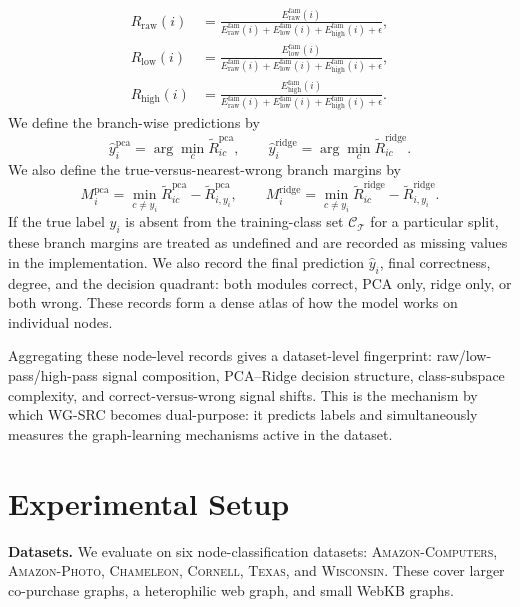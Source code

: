 \documentclass{article}
\newcommand{\Train}{\mathcal{T}}
\newcommand{\Rraw}{R_{\mathrm{raw}}}
\newcommand{\Rlow}{R_{\mathrm{low}}}
\newcommand{\Rhigh}{R_{\mathrm{high}}}
\newcommand{\SRC}{\textsc{WG-SRC}}
\newcommand{\dataset}[1]{\textsc{#1}}
\begin{document}
\begin{align}
\Rraw(i)
&=
\frac{E_{\mathrm{raw}}^{\mathrm{fam}}(i)}
{E_{\mathrm{raw}}^{\mathrm{fam}}(i)
+
E_{\mathrm{low}}^{\mathrm{fam}}(i)
+
E_{\mathrm{high}}^{\mathrm{fam}}(i)
+
\epsilon},\\
\Rlow(i)
&=
\frac{E_{\mathrm{low}}^{\mathrm{fam}}(i)}
{E_{\mathrm{raw}}^{\mathrm{fam}}(i)
+
E_{\mathrm{low}}^{\mathrm{fam}}(i)
+
E_{\mathrm{high}}^{\mathrm{fam}}(i)
+
\epsilon},\\
\Rhigh(i)
&=
\frac{E_{\mathrm{high}}^{\mathrm{fam}}(i)}
{E_{\mathrm{raw}}^{\mathrm{fam}}(i)
+
E_{\mathrm{low}}^{\mathrm{fam}}(i)
+
E_{\mathrm{high}}^{\mathrm{fam}}(i)
+
\epsilon}.
\label{eq:signal-families}
\end{align}
We define the branch-wise predictions by
\begin{equation}
\hat y_i^{\mathrm{pca}}
=
\arg\min_c \widetilde R^{\mathrm{pca}}_{ic},
\qquad
\hat y_i^{\mathrm{ridge}}
=
\arg\min_c \widetilde R^{\mathrm{ridge}}_{ic}.
\label{eq:branch-predictions}
\end{equation}
We also define the true-versus-nearest-wrong branch margins by
\begin{equation}
M_i^{\mathrm{pca}}
=
\min_{c\neq y_i}\widetilde R^{\mathrm{pca}}_{ic}
-
\widetilde R^{\mathrm{pca}}_{i,y_i},
\qquad
M_i^{\mathrm{ridge}}
=
\min_{c\neq y_i}\widetilde R^{\mathrm{ridge}}_{ic}
-
\widetilde R^{\mathrm{ridge}}_{i,y_i}.
\label{eq:branch-margins}
\end{equation}
If the true label $y_i$ is absent from the training-class set
$\mathcal{C}_{\Train}$ for a particular split, these branch margins are treated
as undefined and are recorded as missing values in the implementation.
We also record the final prediction $\hat y_i$, final correctness, degree, and
the decision quadrant: both modules correct, PCA only, ridge only, or both
wrong. These records form a dense atlas of how the model works on individual
nodes.


Aggregating these node-level records gives a dataset-level fingerprint:
raw/low-pass/high-pass signal composition, PCA--Ridge decision structure,
class-subspace complexity, and correct-versus-wrong signal shifts. This is the
mechanism by which \SRC{} becomes dual-purpose: it predicts labels and
simultaneously measures the graph-learning mechanisms active in the dataset.

\section{Experimental Setup}
\textbf{Datasets.} We evaluate on six node-classification datasets:
\dataset{Amazon-Computers}, \dataset{Amazon-Photo}, \dataset{Chameleon},
\dataset{Cornell}, \dataset{Texas}, and \dataset{Wisconsin}. These cover
larger co-purchase graphs, a heterophilic web graph, and small WebKB graphs.
\end{document}
